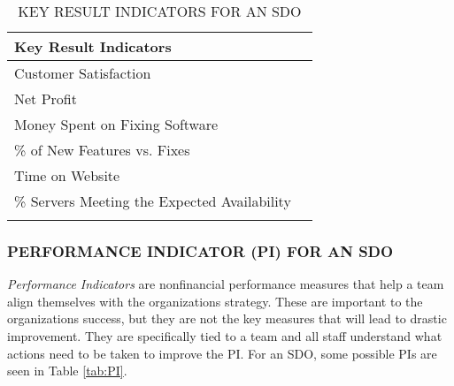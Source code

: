 \documentclass[SDSUThesis.tex]{subfiles}
\begin{document}
            \begin{longtable}{@{}l l}
                \toprule%
                 \centering%
                 {\bfseries Key Result Indicators} &
                 \\
                
                \cmidrule[0.4pt](r{0.125em}){1-1}%
                \endhead
                
                Customer Satisfaction  \\
                \myrowcolour%
                Net Profit \\
                Money Spent on Fixing Software \\
                \myrowcolour%
                \% of New Features vs. Fixes \\
                Time on Website \\
                \myrowcolour%
                \% Servers Meeting the Expected Availability \\
                
                \bottomrule
                
                \caption{KEY RESULT INDICATORS FOR AN SDO}
                \label{tab:KRI}
            \end{longtable}
            
        
        \subsubsection{PERFORMANCE INDICATOR (PI) FOR AN SDO}
            \textit{Performance Indicators} are nonfinancial performance measures
            that help a team align themselves with the organizations 
            strategy.  These are important to the organizations success, but
            they are not the key measures that will lead to drastic improvement.  They are specifically tied to a team and all staff understand
            what actions need to be taken to improve the PI.
            For an SDO, some possible PIs are seen in Table \ref{tab:PI}.
                
\end{document}
